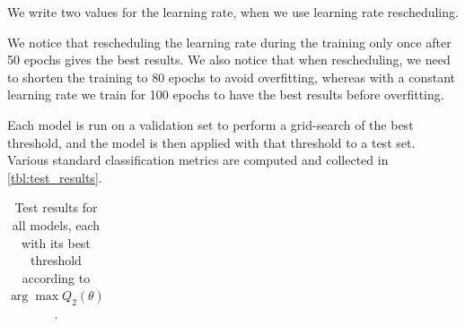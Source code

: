 \documentclass[10pt,conference]{IEEEtran}
\begin{document}
\begin{center}
\begin{tabular}{||c | c  | c | c | c ||}
        \hline
    \end{tabular}
\end{center}
We write two values for the learning rate, when we use learning rate rescheduling. 

We notice that rescheduling the learning rate during the training only once after 50 epochs gives the best results.
We also notice that when rescheduling, we need to shorten the training to 80 epochs to avoid overfitting,
whereas with a constant learning rate we train for 100 epochs to have the best results before overfitting.

Each model is run on a validation set to perform a grid-search of the best threshold,
and the model is then applied with that threshold to a test set.
Various standard classification metrics are computed and collected in \autoref{tbl:test_results}.

%              

\begin{table}[!ht]
    \begin{center}
        \begin{tabular}{||c | c c c c c c||} 
             \hline
             
        \end{tabular}
    \end{center}
    \caption{Test results for all models, each with its best threshold according to $\arg\max Q_2(\theta)$.
    }
    \label{tbl:test_results}
\end{table}
\end{document}
